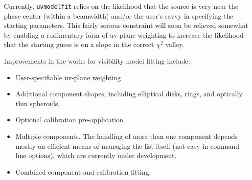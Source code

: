 Currently, {\tt uvmodelfit} relies on the likelihood that the source
is very near the phase center (within a beamwidth) and/or the user's
savvy in specifying the starting parameters.  This fairly serious
constraint will soon be relieved somewhat by enabling a rudimentary
form of uv-plane weighting to increase the likelihood that the
starting guess is on a slope in the correct $\chi^2$ valley.

Improvements in the works for visibility model fitting include:

\begin{itemize}
   \item User-specifiable uv-plane weighting
   \item Additional component shapes, including elliptical disks, rings,
         and optically thin spheroids.
   \item Optional calibration pre-application
   \item Multiple components.  The handling of more than one component
         depends mostly on efficient means of managing the list itself (not easy in
         command line options), which are currently under development.
   \item Combined component and calibration fitting.
\end{itemize}


